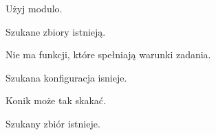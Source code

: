 
\begin{hints_list}
	\item Użyj modulo.
	\item Szukane zbiory istnieją.
	\item Nie ma funkcji, które spełniają warunki zadania.
	\item Szukana konfiguracja isnieje.
	\item Konik może tak skakać.
	\item Szukany zbiór istnieje.
\end{hints_list}